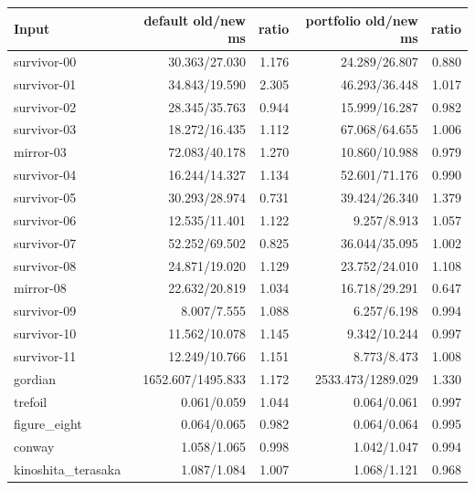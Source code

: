 \begin{center}\small
\begin{tabular}{@{}lrrrr@{}}
\toprule
Input & default old/new ms & ratio & portfolio old/new ms & ratio \\
\midrule
survivor-00 & 30.363/27.030 & 1.176 & 24.289/26.807 & 0.880 \\
survivor-01 & 34.843/19.590 & 2.305 & 46.293/36.448 & 1.017 \\
survivor-02 & 28.345/35.763 & 0.944 & 15.999/16.287 & 0.982 \\
survivor-03 & 18.272/16.435 & 1.112 & 67.068/64.655 & 1.006 \\
mirror-03 & 72.083/40.178 & 1.270 & 10.860/10.988 & 0.979 \\
survivor-04 & 16.244/14.327 & 1.134 & 52.601/71.176 & 0.990 \\
survivor-05 & 30.293/28.974 & 0.731 & 39.424/26.340 & 1.379 \\
survivor-06 & 12.535/11.401 & 1.122 & 9.257/8.913 & 1.057 \\
survivor-07 & 52.252/69.502 & 0.825 & 36.044/35.095 & 1.002 \\
survivor-08 & 24.871/19.020 & 1.129 & 23.752/24.010 & 1.108 \\
mirror-08 & 22.632/20.819 & 1.034 & 16.718/29.291 & 0.647 \\
survivor-09 & 8.007/7.555 & 1.088 & 6.257/6.198 & 0.994 \\
survivor-10 & 11.562/10.078 & 1.145 & 9.342/10.244 & 0.997 \\
survivor-11 & 12.249/10.766 & 1.151 & 8.773/8.473 & 1.008 \\
gordian & 1652.607/1495.833 & 1.172 & 2533.473/1289.029 & 1.330 \\
trefoil & 0.061/0.059 & 1.044 & 0.064/0.061 & 0.997 \\
figure\_eight & 0.064/0.065 & 0.982 & 0.064/0.064 & 0.995 \\
conway & 1.058/1.065 & 0.998 & 1.042/1.047 & 0.994 \\
kinoshita\_terasaka & 1.087/1.084 & 1.007 & 1.068/1.121 & 0.968 \\
\bottomrule
\end{tabular}
\end{center}
